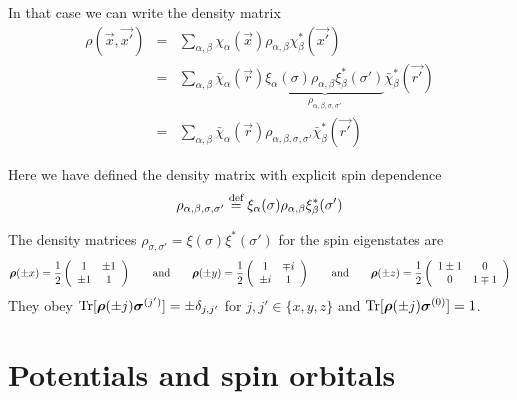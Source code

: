 \documentclass[11pt,a4paper]{report}
\begin{document}
In that case we can write the density matrix
\begin{eqnarray}
\rho(\vec{x},\vec{x'})
&=&\sum_{\alpha,\beta}\chi_{\alpha}(\vec{x})\rho_{\alpha,\beta}\chi^*_{\beta}(\vec{x'})
\nonumber\\
&=&\sum_{\alpha,\beta}\bar{\chi}_{\alpha}(\vec{r})
\underbrace{\xi_\alpha(\sigma)\rho_{\alpha,\beta}\xi^*_\beta(\sigma')}
_{\rho_{\alpha,\beta,\sigma,\sigma'}}
\bar{\chi}^*_{\beta}(\vec{r'})
\nonumber\\
&=&\sum_{\alpha,\beta}\bar{\chi}_{\alpha}(\vec{r})\rho_{\alpha,\beta,\sigma,\sigma'}
\bar{\chi}^*_{\beta}(\vec{r'})
\label{eq:densitymatrixxxprimebyssigmaprime}
\end{eqnarray}

Here we have defined the density matrix with explicit spin dependence
\begin{eqnarray}
\rho_{\alpha,\beta,\sigma,\sigma'}\stackrel{\text{def}}{=}\xi_\alpha(\sigma)\rho_{\alpha,\beta}\xi^*_\beta(\sigma')
\label{eq:defdensitymatrixwithspindep}
\end{eqnarray}

The density matrices
$\rho_{\sigma,\sigma'}=\xi(\sigma)\xi^*(\sigma')$ for the spin
eigenstates 
are
\begin{eqnarray*}
\bm{\rho}(\pm x)=\frac{1}{2}\left(\begin{array}{cc}1&\pm1\\\pm1&1\end{array}\right)
\qquad\text{and}\qquad
\bm{\rho}(\pm y)=\frac{1}{2}\left(\begin{array}{cc}1&\mp i\\\pm i&1\end{array}\right)
\qquad\text{and}\qquad
\bm{\rho}(\pm z)=\frac{1}{2}\left(\begin{array}{cc}1\pm1& 0\\0&1\mp1\end{array}\right)
\end{eqnarray*}
They obey $\mathrm{Tr}[\bm{\rho}(\pm
  j)\bm{\sigma}^{(j')}]=\pm\delta_{j,j'}$ for $j,j'\in\{x,y,z\}$ and 
$\mathrm{Tr}[\bm{\rho}(\pm j)\bm{\sigma}^{(0)}]=1$.






\section{Potentials and spin orbitals}
\end{document}
